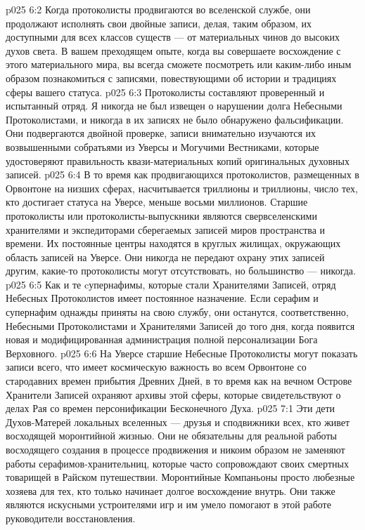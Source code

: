 \vs p025 6:2 Когда протоколисты продвигаются во вселенской службе, они продолжают исполнять свои двойные записи, делая, таким образом, их доступными для всех классов существ --- от материальных чинов до высоких духов света. В вашем преходящем опыте, когда вы совершаете восхождение с этого материального мира, вы всегда сможете посмотреть или каким\hyp{}либо иным образом познакомиться с записями, повествующими об истории и традициях сферы вашего статуса.
\vs p025 6:3 Протоколисты составляют проверенный и испытанный отряд. Я никогда не был извещен о нарушении долга Небесными Протоколистами, и никогда в их записях не было обнаружено фальсификации. Они подвергаются двойной проверке, записи внимательно изучаются их возвышенными собратьями из Уверсы и Могучими Вестниками, которые удостоверяют правильность квази\hyp{}материальных копий оригинальных духовных записей.
\vs p025 6:4 В то время как продвигающихся протоколистов, размещенных в Орвонтоне на низших сферах, насчитывается триллионы и триллионы, число тех, кто достигает статуса на Уверсе, меньше восьми миллионов. Старшие протоколисты или протоколисты\hyp{}выпускники являются свервселенскими хранителями и экспедиторами сберегаемых записей миров пространства и времени. Их постоянные центры находятся в круглых жилищах, окружающих область записей на Уверсе. Они никогда не передают охрану этих записей другим, какие\hyp{}то протоколисты могут отсутствовать, но большинство --- никогда.
\vs p025 6:5 Как и те cупернафимы, которые стали Хранителями Записей, отряд Небесных Протоколистов имеет постоянное назначение. Если серафим и супернафим однажды приняты на свою службу, они останутся, соответственно, Небесными Протоколистами и Хранителями Записей до того дня, когда появится новая и модифицированная администрация полной персонализации Бога Верховного.
\vs p025 6:6 На Уверсе старшие Небесные Протоколисты могут показать записи всего, что имеет космическую важность во всем Орвонтоне со стародавних времен прибытия Древних Дней, в то время как на вечном Острове Хранители Записей охраняют архивы этой сферы, которые свидетельствуют о делах Рая со времен персонификации Бесконечного Духа.
\vs p025 7:1 Эти дети Духов\hyp{}Матерей локальных вселенных --- друзья и сподвижники всех, кто живет восходящей моронтийной жизнью. Они не обязательны для реальной работы восходящего создания в процессе продвижения и никоим образом не заменяют работы серафимов\hyp{}хранительниц, которые часто сопровождают своих смертных товарищей в Райском путешествии. Моронтийные Компаньоны просто любезные хозяева для тех, кто только начинает долгое восхождение внутрь. Они также являются искусными устроителями игр и им умело помогают в этой работе руководители восстановления.

